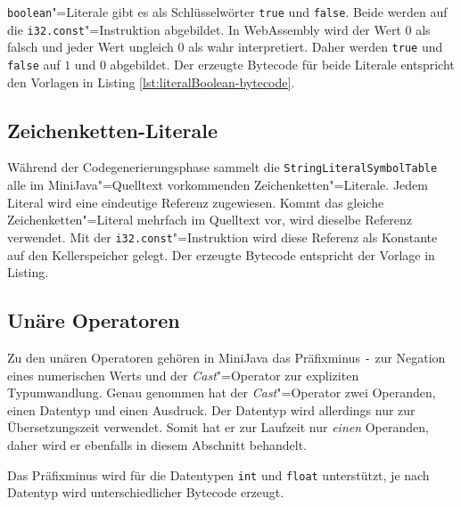 

\lstinline{boolean}"=Literale gibt es als Schlüsselwörter \lstinline{true} und \lstinline{false}. Beide werden auf die \lstinline{i32.const}"=Instruktion abgebildet. In WebAssembly wird der Wert $0$ als falsch und jeder Wert ungleich $0$ als wahr interpretiert. Daher werden \lstinline{true} und \lstinline{false} auf $1$ und $0$ abgebildet. Der erzeugte Bytecode für beide Literale entspricht den Vorlagen in Listing \ref{lst:literalBoolean-bytecode}.



\subsection{Zeichenketten-Literale}
\label{subsec:Zeichenketten-Literale}

Während der Codegenerierungsphase sammelt die \lstinline{StringLiteralSymbolTable} alle im MiniJava"=Quelltext vorkommenden Zeichenketten"=Literale. Jedem Literal wird eine eindeutige Referenz zugewiesen. Kommt das gleiche Zeichenketten"=Literal mehrfach im Quelltext vor, wird dieselbe Referenz verwendet. Mit der \lstinline{i32.const}"=Instruktion wird diese Referenz als Konstante auf den Kellerspeicher gelegt. Der erzeugte Bytecode entspricht der Vorlage in Listing.



\subsection{Unäre Operatoren}
Zu den unären Operatoren gehören in MiniJava das Präfixminus \lstinline{-} zur Negation eines numerischen Werts und der \emph{Cast}"=Operator zur expliziten Typumwandlung. Genau genommen hat der \emph{Cast}"=Operator zwei Operanden, einen Datentyp und einen Ausdruck. Der Datentyp wird allerdings nur zur Übersetzungszeit verwendet. Somit hat er zur Laufzeit nur \emph{einen} Operanden, daher wird er ebenfalls in diesem Abschnitt behandelt.

Das Präfixminus wird für die Datentypen \lstinline{int} und \lstinline{float} unterstützt, je nach Datentyp wird unterschiedlicher Bytecode erzeugt.

